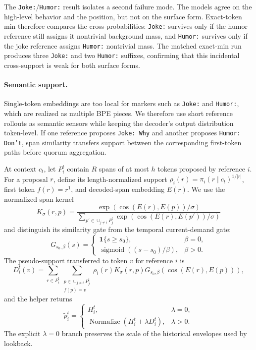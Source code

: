 \documentclass{article}
\begin{document}
The \texttt{Joke:}/\texttt{Humor:} result isolates a second failure mode. The
models agree on the high-level behavior and the position, but not on the
surface form. Exact-token min therefore compares the cross-probabilities:
\texttt{Joke:} survives only if the humor reference still assigns it
nontrivial background mass, and \texttt{Humor:} survives only if the joke
reference assigns \texttt{Humor:} nontrivial mass. The matched exact-min run
produces three \texttt{Joke:} and two \texttt{Humor:} suffixes, confirming
that this incidental cross-support is weak for both surface forms.

\paragraph{Semantic support.}
Single-token embeddings are too local for markers such as \texttt{Joke:} and
\texttt{Humor:}, which are realized as multiple BPE pieces. We therefore use
short reference rollouts as semantic sensors while keeping the decoder's
output distribution token-level. If one reference proposes
\texttt{Joke: Why} and another proposes \texttt{Humor: Don't}, span similarity
transfers support between the corresponding first-token paths before quorum
aggregation.

At context $c_t$, let $P_i^t$ contain $R$ spans of at most $h$ tokens proposed
by reference $i$. For a proposal $r$, define its length-normalized support
$\rho_i(r)=\pi_i(r\mid c_t)^{1/|r|}$, first token $f(r)=r^1$, and decoded-span
embedding $E(r)$. We use the normalized span kernel
\[
K_\sigma(r,p)
=
\frac{\exp(\cos(E(r),E(p))/\sigma)}
{\sum_{p'\in\cup_{j\ne i}P_j^t}
\exp(\cos(E(r),E(p'))/\sigma)}
\]
and distinguish its similarity gate from the temporal current-demand gate:
\[
G_{s_0,\beta}(s)
=
\begin{cases}
\mathbf{1}\{s\ge s_0\}, & \beta=0,\\
\operatorname{sigmoid}((s-s_0)/\beta), & \beta>0.
\end{cases}
\]
The pseudo-support transferred to token $v$ for reference $i$ is
\begin{equation}
D_i^t(v)
=
\sum_{r\in P_i^t}
\sum_{\substack{p\in\cup_{j\ne i}P_j^t\\f(p)=v}}
\rho_i(r)K_\sigma(r,p)
G_{s_0,\beta}\!\left(\cos(E(r),E(p))\right),
\label{eq:semantic-support}
\end{equation}
and the helper returns
\begin{equation}
\widetilde{p}_i^t
=
\begin{cases}
H_i^t, & \lambda=0,\\
\operatorname{Normalize}\!\left(H_i^t+\lambda D_i^t\right), & \lambda>0.
\end{cases}
\label{eq:semantic-update}
\end{equation}
The explicit $\lambda=0$ branch preserves the scale of the historical
envelopes used by lookback.
\end{document}
